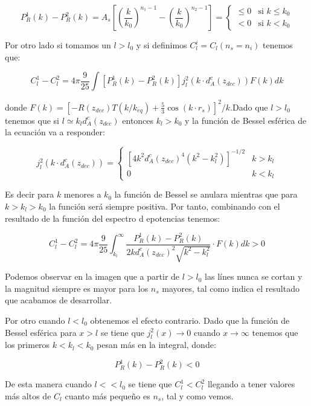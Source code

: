 \documentclass{article}
\begin{document}
$$
P_R^1(k)-P_R^2(k)=A_s\left[\left(\frac{k}{k_0}\right)^{n_1-1} - \left(\frac{k}{k_0}\right)^{n_2-1}\right]=\begin{cases}
\leq 0 &\text{si } k\leq k_0\\
<0 &\text{si } k<k_0
\end{cases}
$$

Por otro lado si tomamos un $l>l_0$ y si definimos $C_l^i=C_l(n_s=n_i)$ tenemos que:

$$
C_l^1-C_l^2=4\pi\frac{9}{25}\int \left[P_R^1(k)-P_R^2(k)\right]j_l^2(k\cdot d_A^c(z_{dec}))F(k) dk
$$

donde $F(k)=\left[-R(z_{dec})T(k/k_{eq})+\frac{5}{3}\cos(k\cdot r_s)\right]^2/k$.Dado que $l>l_0$ tenemos que si $l\simeq k_ld_A^c(z_{dec})$ entonces $k_l>k_0$ y la función de Bessel esférica de la ecuación va a responder:

$$
j_l^2(k\cdot d_A^c(z_{dec}))=\begin{cases}
\left[4k^2 d_A^c(z_{dec})^4(k^2-k_l^2)\right]^{-1/2} & k>k_l\\
0 & k<k_l
\end{cases}
$$

Es decir para $k$ menores a $k_0$ la función de Bessel se anulara mientras que para $k>k_l>k_0$ la función será siempre positiva. Por tanto, combinando con el resultado de la función del espectro d epotencias tenemos:

$$
C_l^1-C_l^2=4\pi\frac{9}{25}\int_{k_l}^\infty \frac{P_R^1(k)-P_R^2(k)}{2k d_A^c(z_{dec})^2\sqrt{k^2-k_l^2}}\cdot F(k) dk>0
$$

Podemos observar en la imagen que a partir de $l>l_0$ las línes nunca se cortan y la magnitud siempre es mayor para los $n_s$ mayores, tal como indica el resultado que acabamos de desarrollar.

Por otro cuando $l<l_0$ obtenemos el efecto contrario. Dado que la función de Bessel esférica para $x>l$ se tiene que $j_l^2(x)\to 0$ cuando $x\to\infty$ tenemos que los primeros $k<k_l<k_0$ pesan más en la integral, donde:

$$
P_R^1(k)-P_R^2(k)<0
$$

De esta manera cuando $l<<l_0$ se tiene que $C_l^1< C_l^2$ llegando a tener valores más altos de $C_l$ cuanto más pequeño es $n_s$, tal y como vemos.
\end{document}
